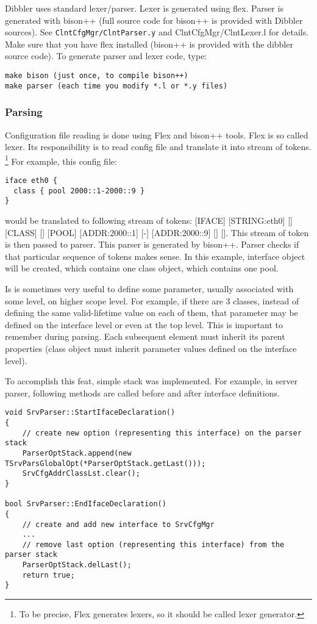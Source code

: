 Dibbler uses standard lexer/parser. Lexer is generated using flex. Parser is
generated with bison++ (full source code for bison++ is provided with
Dibbler sources). See \verb+ClntCfgMgr/ClntParser.y+ and
ClntCfgMgr/ClntLexer.l for details. Make sure that you have flex installed
(bison++ is provided with the dibbler source code). To generate parser
and lexer code, type:

\begin{verbatim}
make bison (just once, to compile bison++)
make parser (each time you modify *.l or *.y files)
\end{verbatim}

\subsubsection{Parsing}
Configuration file reading is done using Flex and bison++ tools. Flex
is so called lexer. Its responsibility is to read config file and
translate it into stream of tokens. \footnote{To be precise, Flex
  generates lexers, so it should be called lexer generator.} For
example, this config file:
\begin{verbatim}
iface eth0 {
  class { pool 2000::1-2000::9 }
}
\end{verbatim}

would be translated to following stream of tokens: [IFACE]
[STRING:eth0] [{] [CLASS] [{] [POOL] [ADDR:2000::1] [-] [ADDR:2000::9]
[}] [}]. This stream of token is then passed to parser. This parser is
generated by bison++. Parser checks if that particular sequence of
tokens makes sense. In this example, interface object will be created,
which contains one class object, which contains one pool.

Is is sometimes very useful to define some parameter, usually
associated with some level, on higher scope level. For example, if
there are 3 classes, instead of defining the same valid-lifetime value
on each of them, that parameter may be defined on the interface
level or even at the top level. This is important to remember during
parsing. Each subsequent element must inherit its parent properties
(class object must inherit parameter values defined on the interface
level).

To accomplish this feat, simple stack was implemented. For example, in
server parser, following methods are called before and after interface
definitions.

\begin{verbatim}
void SrvParser::StartIfaceDeclaration()
{
    // create new option (representing this interface) on the parser stack
    ParserOptStack.append(new TSrvParsGlobalOpt(*ParserOptStack.getLast()));
    SrvCfgAddrClassLst.clear();
}

bool SrvParser::EndIfaceDeclaration()
{
    // create and add new interface to SrvCfgMgr
    ...
    // remove last option (representing this interface) from the parser stack
    ParserOptStack.delLast();
    return true;
}   
\end{verbatim}



